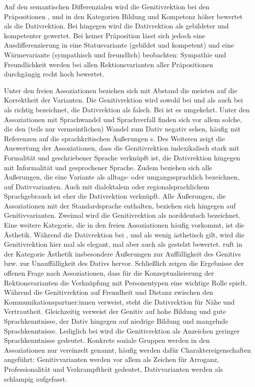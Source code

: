 Auf den semantischen Differenzialen wird die Genitivrektion bei den Präpositionen \wegen{}, \waehrend{} und \dank{} in den Kategorien \glqq Bildung\grqq{} und \glqq Kompetenz\grqq{} höher bewertet als die Dativrektion. 
Bei \gegenueber{} hingegen wird die Dativrektion als gebildeter und kompetenter gewertet. 
Bei keiner Präposition lässt sich jedoch eine Ausdifferenzierung in eine Statusvariante (gebildet und kompetent) und eine Wärmevariante (sympathisch und freundlich) beobachten:
Sympathie und Freundlichkeit werden bei allen Rektionsvarianten aller Präpositionen durchgängig recht hoch bewertet. 

Unter den freien Assoziationen beziehen sich mit Abstand die meisten auf die Korrektheit der Varianten.
Die Genitivrektion wird sowohl bei \wegen{} und \waehrend{} als auch bei \dank{} als richtig bezeichnet, die Dativrektion als falsch. 
Bei \gegenueber{} ist es umgekehrt. 
Unter den Assoziationen mit Sprachwandel und Sprachverfall finden sich vor allem solche, die den (teils nur vermeintlichen) Wandel zum Dativ negativ sehen, häufig mit Referenzen auf die sprachkritischen Äußerungen \citeauthor[]{Sick2006}s. 
Des Weiteren zeigt die Auswertung der Assoziationen, dass die Genitivrektion indexikalisch stark mit Formalität und geschriebener Sprache verknüpft ist, die Dativrektion hingegen mit Informalität und gesprochener Sprache.
Zudem beziehen sich alle Äußerungen, die eine Variante als alltags- oder umgangssprachlich bezeichnen, auf Dativvarianten. 
Auch mit dialektalem oder regionalsprachlichem Sprachgebrauch ist eher die Dativrektion verknüpft. 
Alle Äußerungen, die Assoziationen mit der Standardsprache enthalten, beziehen sich hingegen auf Genitivvarianten. 
Zweimal wird die Genitivrektion als norddeutsch bezeichnet. 
Eine weitere Kategorie, die in den freien Assoziationen häufig vorkommt, ist die Ästhetik. 
Während die Dativrektion bei \wegen, \waehrend{} und \dank{} als wenig ästhetisch gilt, wird die Genitivrektion hier mal als elegant, mal aber auch als gestelzt bewertet. 
 ruft in der Kategorie \glqq Ästhetik\grqq{} insbesondere Äußerungen zur Auffälligkeit des Genitivs bzw. zur Unauffälligkeit des Dativs hervor. 
Schließlich zeigen die Ergebnisse der offenen Frage nach Assoziationen, dass für die Konzeptualisierung der Rektionsvarianten die Verknüpfung mit Personentypen eine wichtige Rolle spielt. 
Während die Genitivrektion auf Fremdheit und Distanz zwischen den Kommunikationspartner:innen verweist, steht die Dativrektion für Nähe und Vertrautheit. 
Gleichzeitig verweist der Genitiv auf hohe Bildung und gute Sprachkenntnisse, der Dativ hingegen auf niedrige Bildung und mangelnde Sprachkenntnisse. 
Lediglich bei \gegenueber{} wird die Genitivrektion als Anzeichen geringer Sprachkenntnisse gedeutet. 
Konkrete soziale Gruppen werden in den Assoziationen nur vereinzelt genannt, häufig werden dafür Charaktereigenschaften angeführt:
Genitivvarianten werden vor allem als Zeichen für Arroganz, Professionalität und Verkrampftheit gedeutet, Dativvarianten werden als schlampig aufgefasst. 

